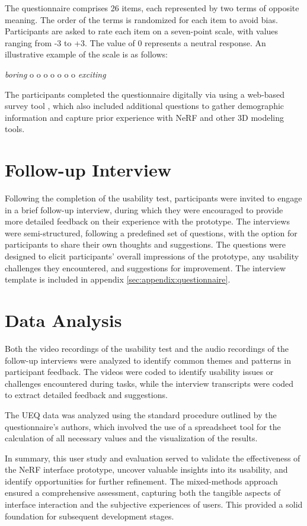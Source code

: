 The questionnaire comprises 26 items, each represented by two terms of opposite meaning. The order of the terms is randomized for each item to avoid bias.
Participants are asked to rate each item on a seven-point scale, with values ranging from -3 to +3. The value of 0 represents a neutral response.
An illustrative example of the scale is as follows:

\begin{center}
  \emph{boring} \quad o o o o o o o \quad \emph{exciting}
\end{center}

The participants completed the questionnaire digitally via using a web-based survey tool \cite{noauthor_sosci_nodate}, which also included additional questions to gather demographic information and capture prior experience with NeRF and other 3D modeling tools.

\section{Follow-up Interview}
\label{sec:study:interview}

Following the completion of the usability test, participants were invited to engage in a brief follow-up interview, during which they were encouraged to provide more detailed feedback on their experience with the prototype.
The interviews were semi-structured, following a predefined set of questions, with the option for participants to share their own thoughts and suggestions.
The questions were designed to elicit participants' overall impressions of the prototype, any usability challenges they encountered, and suggestions for improvement.
The interview template is included in appendix \ref{sec:appendix:questionnaire}.

\section{Data Analysis}
\label{sec:study:analysis}

Both the video recordings of the usability test and the audio recordings of the follow-up interviews were analyzed to identify common themes and patterns in participant feedback.
The videos were coded to identify usability issues or challenges encountered during tasks, while the interview transcripts were coded to extract detailed feedback and suggestions.

The UEQ data was analyzed using the standard procedure outlined by the questionnaire's authors, which involved the use of a spreadsheet tool for the calculation of all necessary values and the visualization of the results.

In summary, this user study and evaluation served to validate the effectiveness of the NeRF interface prototype, uncover valuable insights into its usability, and identify opportunities for further refinement.
The mixed-methods approach ensured a comprehensive assessment, capturing both the tangible aspects of interface interaction and the subjective experiences of users. This provided a solid foundation for subsequent development stages.
